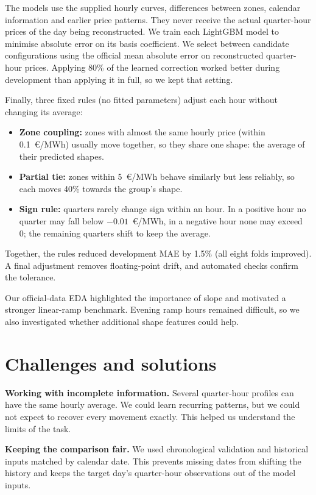 \documentclass[10pt,a4paper]{article}
\begin{document}
The models use the supplied hourly curves, differences between zones, calendar information and earlier price patterns. They never receive the actual quarter-hour prices of the day being reconstructed. We train each LightGBM model to minimise absolute error on its basis coefficient. We select between candidate configurations using the official mean absolute error on reconstructed quarter-hour prices. Applying 80\% of the learned correction worked better during development than applying it in full, so we kept that setting.

Finally, three fixed rules (no fitted parameters) adjust each hour without changing its average:
\begin{itemize}
\item \textbf{Zone coupling:} zones with almost the same hourly price (within 0.1~\euro{}/MWh) usually move together, so they share one shape: the average of their predicted shapes.
\item \textbf{Partial tie:} zones within 5~\euro{}/MWh behave similarly but less reliably, so each moves 40\% towards the group's shape.
\item \textbf{Sign rule:} quarters rarely change sign within an hour. In a positive hour no quarter may fall below $-0.01$~\euro{}/MWh, in a negative hour none may exceed 0; the remaining quarters shift to keep the average.
\end{itemize}
Together, the rules reduced development MAE by 1.5\% (all eight folds improved). A final adjustment removes floating-point drift, and automated checks confirm the tolerance.

Our official-data EDA highlighted the importance of slope and motivated a stronger linear-ramp benchmark. Evening ramp hours remained difficult, so we also investigated whether additional shape features could help.

\section{Challenges and solutions}
\textbf{Working with incomplete information.} Several quarter-hour profiles can have the same hourly average. We could learn recurring patterns, but we could not expect to recover every movement exactly. This helped us understand the limits of the task.

 \textbf{Keeping the comparison fair.} We used chronological validation and historical inputs matched by calendar date. This prevents missing dates from shifting the history and keeps the target day's quarter-hour observations out of the model inputs.
\end{document}
